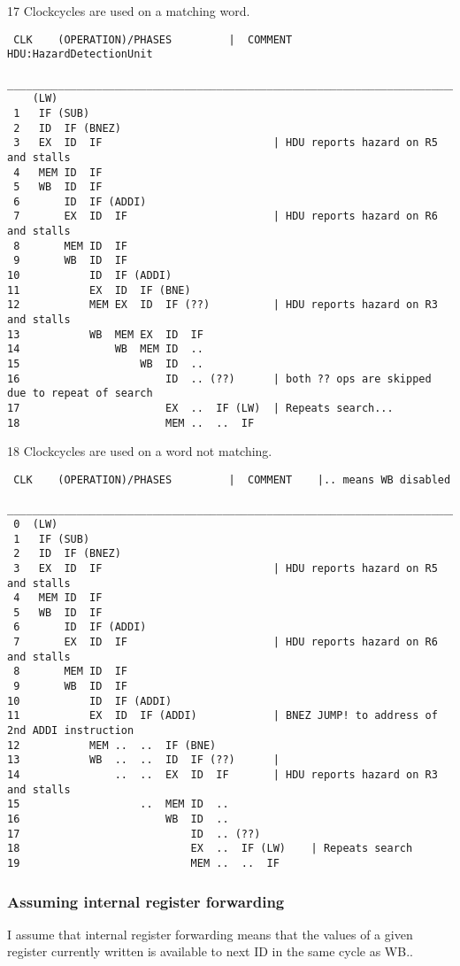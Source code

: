 \documentclass[a4paper,10pt]{article}
\begin{document}
17 Clockcycles are used on a matching word.
\begin{verbatim}
 CLK    (OPERATION)/PHASES         |  COMMENT   HDU:HazardDetectionUnit
 ________________________________________________________________________________________________
    (LW)  
 1   IF (SUB)
 2   ID  IF (BNEZ) 
 3   EX  ID  IF                           | HDU reports hazard on R5 and stalls
 4   MEM ID  IF     
 5   WB  ID  IF 
 6       ID  IF (ADDI)
 7       EX  ID  IF                       | HDU reports hazard on R6 and stalls
 8       MEM ID  IF    
 9       WB  ID  IF  
10           ID  IF (ADDI)
11           EX  ID  IF (BNE)
12           MEM EX  ID  IF (??)          | HDU reports hazard on R3 and stalls
13           WB  MEM EX  ID  IF           
14               WB  MEM ID  ..   
15                   WB  ID  .. 
16                       ID  .. (??)      | both ?? ops are skipped due to repeat of search
17                       EX  ..  IF (LW)  | Repeats search...
18                       MEM ..  ..  IF   
\end{verbatim}



18 Clockcycles are used on a word not matching.
\begin{verbatim}
 CLK    (OPERATION)/PHASES         |  COMMENT    |.. means WB disabled
 ________________________________________________________________________________________________
 0  (LW)  
 1   IF (SUB)
 2   ID  IF (BNEZ) 
 3   EX  ID  IF                           | HDU reports hazard on R5 and stalls
 4   MEM ID  IF     
 5   WB  ID  IF 
 6       ID  IF (ADDI)
 7       EX  ID  IF                       | HDU reports hazard on R6 and stalls
 8       MEM ID  IF    
 9       WB  ID  IF  
10           ID  IF (ADDI)
11           EX  ID  IF (ADDI)            | BNEZ JUMP! to address of 2nd ADDI instruction
12           MEM ..  ..  IF (BNE)
13           WB  ..  ..  ID  IF (??)      | 
14               ..  ..  EX  ID  IF       | HDU reports hazard on R3 and stalls
15                   ..  MEM ID  ..  
16                       WB  ID  .. 
17                           ID  .. (??)
18                           EX  ..  IF (LW)    | Repeats search
19                           MEM ..  ..  IF
\end{verbatim}

\newpage
\subsubsection{Assuming internal register forwarding}
I assume that internal register forwarding means that the values of a given register currently written is available to next ID in the same cycle as WB..
\end{document}
